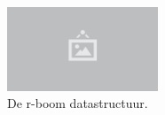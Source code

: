 \begin{figure}
  \centering
  \includegraphics[width=0.4\textwidth]{./img/raw/placeholder.png}
  \caption{De r-boom datastructuur.}
  \label{fig:hs-datastructuur-r}
\end{figure}
